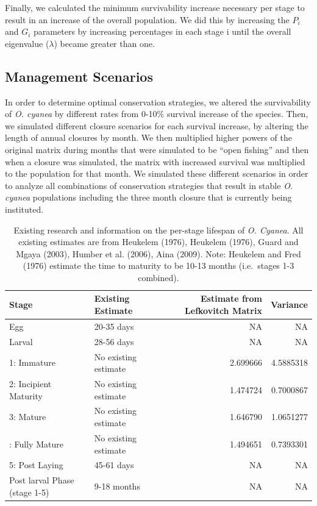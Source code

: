 \documentclass[
]{article}
\begin{document}
Finally, we calculated the minimum survivability increase necessary per stage to result in an increase of the overall population. We did this by increasing the \(P_i\) and \(G_i\) parameters by increasing percentages in each stage i until the overall eigenvalue (\(\lambda\)) became greater than one.

\hypertarget{management-scenarios}{%
\subsection{Management Scenarios}\label{management-scenarios}}

In order to determine optimal conservation strategies, we altered the survivability of \emph{O. cyanea} by different rates from 0-10\% survival increase of the species. Then, we simulated different closure scenarios for each survival increase, by altering the length of annual closures by month. We then multiplied higher powers of the original matrix during months that were simulated to be ``open fishing'' and then when a closure was simulated, the matrix with increased survival was multiplied to the population for that month. We simulated these different scenarios in order to analyze all combinations of conservation strategies that result in stable \emph{O. cyanea} populations including the three month closure that is currently being instituted.

\begin{table}

\caption{\label{tab:LifeHistory}Existing research and information on the per-stage lifespan of \emph{O. Cyanea}. All existing estimates are from Heukelem (1976), Heukelem (1976), Guard and Mgaya (2003), Humber et al. (2006), Aina (2009). Note: Heukelem and Fred (1976) estimate the time to maturity to be 10-13 months (i.e.~stages 1-3 combined). \label{LifeHistory}}
\centering
\begin{tabular}[t]{llrr}
\toprule
Stage & Existing Estimate & Estimate from Lefkovitch Matrix & Variance\\
\midrule
Egg & 20-35 days & NA & NA\\
Larval & 28-56 days & NA & NA\\
1: Immature & No existing estimate & 2.699666 & 4.5885318\\
2: Incipient Maturity & No existing estimate & 1.474724 & 0.7000867\\
3: Mature & No existing estimate & 1.646790 & 1.0651277\\
\addlinespace
4: Fully Mature & No existing estimate & 1.494651 & 0.7393301\\
5: Post Laying & 45-61 days & NA & NA\\
Post larval Phase (stage 1-5) & 9-18 months & NA & NA\\
\bottomrule
\end{tabular}
\end{table}
\end{document}
